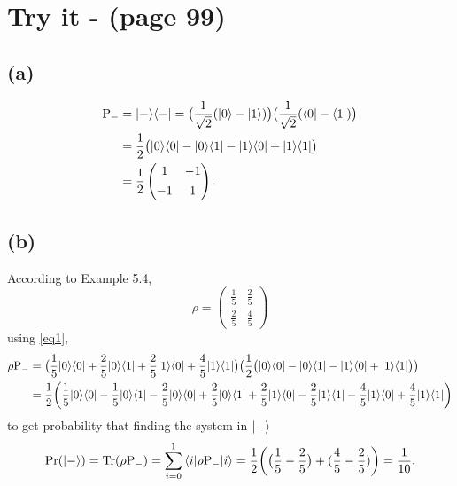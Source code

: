 \documentclass{article}
\newcommand{\op}[2]{|#1\rangle \langle#2|}
\newcommand{\sand}[3]{\braket{#1 | #2 | #3}}
\begin{document}
\section*{Try it - (page 99)}
\subsection*{(a)}
\begin{align}
   \text{P}_{-} &= \op{-}{-} = \big(\frac{1}{\sqrt{2}}(\ket{0} - \ket{1})\big)\big(\frac{1}{\sqrt{2}}(\bra{0} - \bra{1})\big) \nonumber \\
   &= \frac{1}{2}\big(\op{0}{0} - \op{0}{1} - \op{1}{0} + \op{1}{1}\big) \nonumber \\
   &= \frac{1}{2}
   \begin{pmatrix}
   1 & -1 \\[0.4em]
   -1 & 1   
   \end{pmatrix}. \label{eq1}
\end{align}
\subsection*{(b)}
According to Example 5.4,
\begin{equation*}
   \rho =  
   \begin{pmatrix}
      \displaystyle\frac{1}{5} & \displaystyle\frac{2}{5} \\[1em]
      \displaystyle\frac{2}{5} & \displaystyle\frac{4}{5}
   \end{pmatrix}
\end{equation*}
using \ref{eq1},
\begin{align*}
   \rho \text{\text{P}}_{-} &= \big(\frac{1}{5}\op{0}{0} + \frac{2}{5}\op{0}{1} + \frac{2}{5}\op{1}{0} + \frac{4}{5}\op{1}{1}\big)\big(\frac{1}{2}\big(\op{0}{0} - \op{0}{1} - \op{1}{0} + \op{1}{1}\big)\big)\\
   &= \frac{1}{2}\bigg(\frac{1}{5}\op{0}{0} - \frac{1}{5}\op{0}{1} - \frac{2}{5}\op{0}{0} + \frac{2}{5}\op{0}{1} + \frac{2}{5}\op{1}{0} - \frac{2}{5}\op{1}{1} - \frac{4}{5}\op{1}{0} + \frac{4}{5}\op{1}{1}\bigg)
\end{align*}
to get probability that finding the system in $\ket{-}$
\begin{equation*}
   \text{Pr}(\ket{-}) = \text{Tr}(\rho \text{P}_{-}) = \sum_{i=0}^{1} \sand{i}{\rho \text{P}_{-}}{i} = \frac{1}{2}\bigg(\big(\frac{1}{5} - \frac{2}{5}\big) + (\frac{4}{5} - \frac{2}{5})\bigg) = \frac{1}{10}.
\end{equation*}
\end{document}
